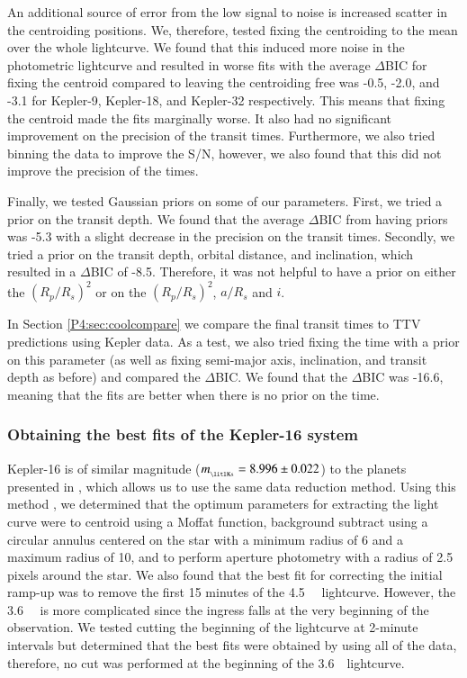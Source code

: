 An additional source of error from the low signal to noise is increased scatter in the centroiding positions. We, therefore, tested fixing the centroiding to the mean over the whole lightcurve. We found that this induced more noise in the photometric lightcurve and resulted in worse fits with the average $\Delta$BIC for fixing the centroid compared to leaving the centroiding free was -0.5, -2.0, and -3.1 for Kepler-9, Kepler-18, and Kepler-32 respectively. This means that fixing the centroid made the fits marginally worse. It also had no significant improvement on the precision of the transit times. Furthermore, we also tried binning the data to improve the S/N, however,  we also found that this did not improve the precision of the times. %

Finally, we tested Gaussian priors on some of our parameters. First, we tried a prior on the transit depth. We found that the average $\Delta$BIC from having priors was -5.3 with a slight decrease in the precision on the transit times. Secondly, we tried a prior on the transit depth, orbital distance, and inclination, which resulted in a $\Delta$BIC of -8.5.  Therefore, it was not helpful to have a prior on either the $(R_p/R_s)^2$ or on the $(R_p/R_s)^2$, $a/R_s$ and $i$.

In Section \ref{P4:sec:coolcompare} we compare the final transit times to TTV predictions using Kepler data. As a test, we also tried fixing the time with a prior on this parameter (as well as fixing semi-major axis, inclination, and transit depth as before) and compared the $\Delta$BIC. We found that the $\Delta$BIC was -16.6, meaning that the fits are better when there is no prior on the time.

\subsubsection{Obtaining the best fits of the Kepler-16 system}

Kepler-16 is of similar magnitude ($m_{_{\rm \litl Ks}}=8.996\pm0.022$) to the planets presented in \citet{Baxter2021}, which allows us to use the same data reduction method. Using this method \citep[outlined in ][]{Baxter2021}, we determined that the optimum parameters for extracting the light curve were to centroid using a Moffat function, background subtract using a circular annulus centered on the star with a minimum radius of 6 and a maximum radius of 10, and to perform aperture photometry with a radius of 2.5 pixels around the star. We also found that the best fit for correcting the initial ramp-up was to remove the first 15 minutes of the 4.5~\um~ lightcurve. However, the 3.6~\um~ is more complicated since the ingress falls at the very beginning of the observation. We tested cutting the beginning of the lightcurve at 2-minute intervals but determined that the best fits were obtained by using all of the data, therefore, no cut was performed at the beginning of the 3.6~\um~lightcurve.

